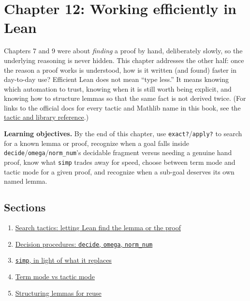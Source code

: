 \chapter{Chapter 12: Working efficiently in Lean}\label{sec:12-working-efficiently:00-index:1}

Chapters 7 and 9 were about \emph{finding} a proof by hand, deliberately slowly, so the underlying reasoning is never hidden. This chapter addresses the other half: once the reason a proof works is understood, how is it written (and found) faster in day-to-day use? Efficient Lean does not mean ``type less.'' It means knowing which automation to trust, knowing when it is still worth being explicit, and knowing how to structure lemmas so that the same fact is not derived twice. (For links to the official docs for every tactic and Mathlib name in this book, see the \hyperref[sec:root:tactic-and-library-reference:1]{tactic and library reference}.)

\textbf{Learning objectives.} By the end of this chapter, use \texttt{exact?}/\texttt{apply?} to search for a known lemma or proof, recognize when a goal falls inside \texttt{decide}/\texttt{omega}/\texttt{norm\_num}'s decidable fragment versus needing a genuine hand proof, know what \texttt{simp} trades away for speed, choose between term mode and tactic mode for a given proof, and recognize when a sub-goal deserves its own named lemma.

\section{Sections}\label{sec:12-working-efficiently:00-index:2}

\begin{enumerate}
\def\labelenumi{\arabic{enumi}.}
\tightlist
\item
  \hyperref[sec:12-working-efficiently:01-search-tactics:1]{Search tactics: letting Lean find the lemma or the proof}
\item
  \hyperref[sec:12-working-efficiently:02-decision-procedures:1]{Decision procedures: \texttt{decide}, \texttt{omega}, \texttt{norm\_num}}
\item
  \hyperref[sec:12-working-efficiently:03-simp:1]{\texttt{simp}, in light of what it replaces}
\item
  \hyperref[sec:12-working-efficiently:04-term-vs-tactic-mode:1]{Term mode vs tactic mode}
\item
  \hyperref[sec:12-working-efficiently:05-structuring-lemmas:1]{Structuring lemmas for reuse}
\end{enumerate}






